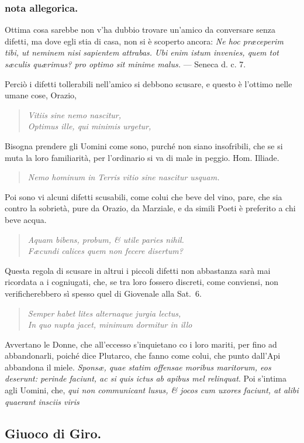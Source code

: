 \documentclass[11pt,a6paper]{article}
\newcommand{\literaryquote}[1]{%
\kern -6pt  \begin{verse}
    {\footnotesize \it #1}
  \end{verse}\kern -2pt%
}
\begin{document}
\subsubsection{nota allegorica.}
{\footnotesize
Ottima cosa sarebbe non v'ha dubbio trovare
un'amico da conversare senza difetti, ma dove egli
stia di casa, non si è scoperto ancora: \textit{Ne hoc præceperim
tibi, ut neminem nisi sapientem attrabas.
Ubi enim istum invenies, quem tot sæculis quærimus?
pro optimo sit minime malus.} — Seneca d. c. 7.

Perciò i difetti tollerabili nell'amico si debbono
scusare, e questo è l'ottimo nelle umane cose, Orazio,

\literaryquote{
 Vitiis sine nemo nascitur,\\
 Optimus ille, qui minimis urgetur,}

Bisogna prendere gli Uomini come sono, purché
non siano insofribili, che se si muta la loro familiarità,
per l'ordinario si va di male in peggio. Hom.
Illiade.

\literaryquote{Nemo hominum in Terris vitio sine nascitur usquam.}

Poi sono vi alcuni difetti scusabili, come colui che
beve del vino, pare, che sia contro la sobrietà, pure
da Orazio, da Marziale, e da simili Poeti è preferito
a chi beve acqua.

\literaryquote{Aquam bibens, probum, \& utile paries nihil.\\
 Fæcundi calices quem non fecere disertum?}

Questa regola di scusare in altrui i piccoli difetti
non abbastanza sarà mai ricordata a i cogniugati,
che, se tra loro fossero discreti, come conviensi,
non verificherebbero sì spesso quel di Giovenale
alla Sat.~6.

\literaryquote{Semper habet lites alternaque jurgia lectus,\\
In quo nupta jacet, minimum dormitur in illo}

Avvertano le Donne, che all'eccesso s'inquietano
co i loro mariti, per fino ad abbandonarli, poiché
dice Plutarco, che fanno come colui, che punto
dall'Api abbandona il miele. \textit{Sponsæ, quae statim
offensae moribus maritorum, eos deserunt: perinde
faciunt, ac si quis ictus ab apibus mel relinquat}.
Poi s'intima agli Uomini, che, \textit{qui non communicant
lusus, \& jocos cum uxores faciunt, at alibi
quaerant insciis viris}
}

\subsection{Giuoco di Giro.}
\end{document}
